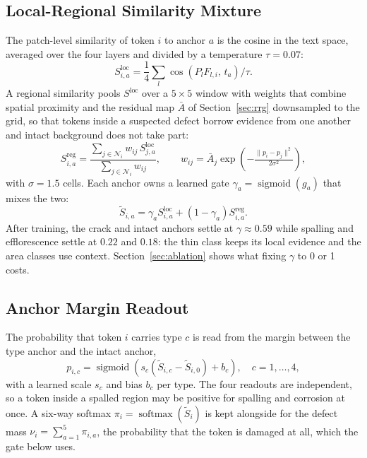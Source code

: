 \documentclass[conference]{IEEEtran}
\begin{document}
\subsection{Local-Regional Similarity Mixture}
The patch-level similarity of token $i$ to anchor $a$ is the cosine in the text space, averaged over the four layers and divided by a temperature $\tau=0.07$:
\begin{equation}
S^{\mathrm{loc}}_{i,a}=\frac{1}{4}\sum_l \cos\!\left(P_l F_{l,i},\,t_a\right)/\tau .
\end{equation}
A regional similarity pools $S^{\mathrm{loc}}$ over a $5\times5$ window with weights that combine spatial proximity and the residual map $\bar A$ of Section~\ref{sec:rrg} downsampled to the grid, so that tokens inside a suspected defect borrow evidence from one another and intact background does not take part:
\begin{equation}
S^{\mathrm{reg}}_{i,a}=\frac{\sum_{j\in\mathcal{N}_i} w_{ij}\,S^{\mathrm{loc}}_{j,a}}{\sum_{j\in\mathcal{N}_i} w_{ij}},\qquad w_{ij}=\bar A_j\exp\!\left(-\tfrac{\|p_i-p_j\|^2}{2\sigma^2}\right),
\end{equation}
with $\sigma=1.5$ cells. Each anchor owns a learned gate $\gamma_a=\operatorname{sigmoid}(g_a)$ that mixes the two:
\begin{equation}
\tilde S_{i,a}=\gamma_a S^{\mathrm{loc}}_{i,a}+(1-\gamma_a)S^{\mathrm{reg}}_{i,a}.
\end{equation}
After training, the crack and intact anchors settle at $\gamma\approx0.59$ while spalling and efflorescence settle at $0.22$ and $0.18$: the thin class keeps its local evidence and the area classes use context. Section~\ref{sec:ablation} shows what fixing $\gamma$ to 0 or 1 costs.

\subsection{Anchor Margin Readout}
The probability that token $i$ carries type $c$ is read from the margin between the type anchor and the intact anchor,
\begin{equation}
p_{i,c}=\operatorname{sigmoid}\!\left(s_c(\tilde S_{i,c}-\tilde S_{i,0})+b_c\right),\quad c=1,\dots,4,
\end{equation}
with a learned scale $s_c$ and bias $b_c$ per type. The four readouts are independent, so a token inside a spalled region may be positive for spalling and corrosion at once. A six-way softmax $\pi_i=\operatorname{softmax}(\tilde S_i)$ is kept alongside for the defect mass $\nu_i=\sum_{a=1}^{5}\pi_{i,a}$, the probability that the token is damaged at all, which the gate below uses.
\end{document}
